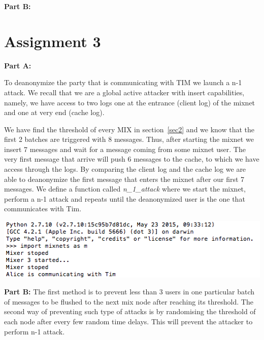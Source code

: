 \documentclass[preprint,12pt,3p]{elsarticle}
\begin{document}
\textbf{Part B:}

\section*{Assignment 3}
\textbf{Part A:}

To deanonymize the party that is communicating with TIM we launch a n-1 attack. We recall that we are a global active attacker with insert capabilities, namely, we have access to two logs one at the entrance (client log) of the mixnet and one at very end (cache log).

We have find the threshold of every MIX in section~\ref{sec2} and we know that the first 2 batches are triggered with 8 messages. Thus, after starting the mixnet we insert 7 messages and wait for a message coming from some mixnet user. The very first message that arrive will push 6 messages to the cache, to which we have access through the logs. By comparing the client log and the cache log we are able to deanonymize the first message that enters the mixnet after our first 7 messages. We define a function called \textit{n\_1\_attack} where we start the mixnet, perform a n-1 attack and repeats until the deanonymized user is the one that communicates with Tim. \newline

\includegraphics[width=\textwidth]{alice}

\textbf{Part B:}
The first method is to prevent less than 3 users in one particular batch of messages to be flushed to the next mix node after reaching its threshold. 
The second way of preventing such type of attacks is by randomising the threshold of each node after every few random time delays. This will prevent the attacker to perform n-1 attack.





\appendix




\end{document}
